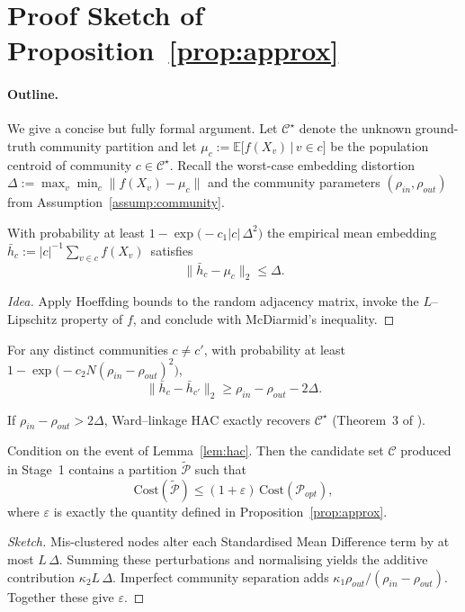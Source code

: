 \documentclass[final,3p,fleqn, 10pt]{elsarticle}
\begin{document}
\appendix
\section{Proof Sketch of Proposition~\ref{prop:approx}}\label{app:proof_prop1}
\paragraph{Outline.} We give a concise but fully formal argument.  Let $\mathcal{C}^{\star}$ denote the unknown ground-truth community partition and let $\mu_{c}:=\mathbb E\bigl[f(X_v)\,\big|\,v\in c\bigr]$ be the population centroid of community $c\in\mathcal{C}^{\star}$.  Recall the worst-case embedding distortion $\Delta:=\max_{v}\min_{c}\|f(X_v)-\mu_{c}\|$ and the community parameters $(\rho_{in},\rho_{out})$ from Assumption~\ref{assump:community}.

\begin{lemma}\label{lem:conc}
With probability at least $1-\exp\!\bigl(-c_1|c|\,\Delta^{2}\bigr)$ the empirical mean embedding \,$\bar h_{c}:=|c|^{-1}\sum_{v\in c}f(X_v)$\, satisfies 
\[\|\bar h_{c}-\mu_{c}\|_2\le\Delta.\]
\end{lemma}
\begin{proof}[Idea]
Apply Hoeffding bounds to the random adjacency matrix, invoke the $L$–Lipschitz property of $f$, and conclude with McDiarmid’s inequality.
\end{proof}

\begin{lemma}\label{lem:sep}
For any distinct communities $c\neq c'$, with probability at least $1-\exp\!\bigl(-c_2 N(\rho_{in}-\rho_{out})^{2}\bigr)$,
\[\|\bar h_{c}-\bar h_{c'}\|_2\ge\rho_{in}-\rho_{out}-2\Delta.\]
\end{lemma}

\begin{lemma}\label{lem:hac}
If $\rho_{in}-\rho_{out}>2\Delta$, Ward–linkage HAC exactly recovers $\mathcal{C}^{\star}$ (Theorem~3 of \citealp{vonLuxburg2010}).
\end{lemma}

\begin{lemma}\label{lem:cost}
Condition on the event of Lemma~\ref{lem:hac}.  Then the candidate set $\mathcal{C}$ produced in Stage~1 contains a partition $\tilde{\mathcal P}$ such that
\[\text{Cost}(\tilde{\mathcal P})\le(1+\varepsilon)\,\text{Cost}(\mathcal P_{opt}),\]
where $\varepsilon$ is exactly the quantity defined in Proposition~\ref{prop:approx}.
\end{lemma}
\begin{proof}[Sketch]
Mis-clustered nodes alter each Standardised Mean Difference term by at most $L\,\Delta$.  Summing these perturbations and normalising yields the additive contribution $\kappa_{2}L\,\Delta$.  Imperfect community separation adds $\kappa_{1}\rho_{out}/(\rho_{in}-\rho_{out})$.  Together these give $\varepsilon$.
\end{proof}
\end{document}

